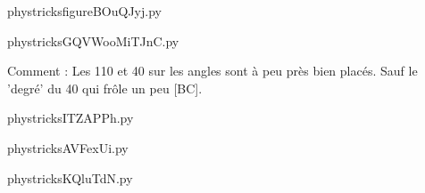     

    \clearpage
    


    \newcommand{\CaptionFigfigureBOuQJyj}{<+Type your caption here+>}
    \begin{center}
        
    \end{center}
    phystricksfigureBOuQJyj.py

    

    \clearpage
    


    \newcommand{\CaptionFigGQVWooMiTJnC}{<+Type your caption here+>}
    \begin{center}
        
    \end{center}
    phystricksGQVWooMiTJnC.py

    Comment : Les 110 et 40 sur les angles sont à peu près bien placés. Sauf le 'degré' du 40 qui frôle un peu [BC].

    \clearpage
    


    \newcommand{\CaptionFigITZAPPh}{<+Type your caption here+>}
    \begin{center}
        
    \end{center}
    phystricksITZAPPh.py

    

    \clearpage
    


    \newcommand{\CaptionFigAVFexUi}{<+Type your caption here+>}
    \begin{center}
        
    \end{center}
    phystricksAVFexUi.py

    

    \clearpage
    


    \newcommand{\CaptionFigKQluTdN}{<+Type your caption here+>}
    \begin{center}
        
    \end{center}
    phystricksKQluTdN.py

    

    \clearpage
    

